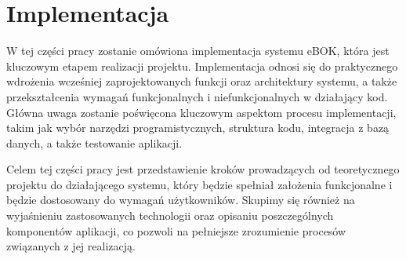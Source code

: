 \chapter{Implementacja}
W tej części pracy zostanie omówiona implementacja systemu eBOK, która jest kluczowym etapem realizacji projektu. Implementacja odnosi się do praktycznego wdrożenia wcześniej zaprojektowanych funkcji oraz architektury systemu, a także przekształcenia wymagań funkcjonalnych i niefunkcjonalnych w działający kod. Główna uwaga zostanie poświęcona kluczowym aspektom procesu implementacji, takim jak wybór narzędzi programistycznych, struktura kodu, integracja z bazą danych, a także testowanie aplikacji.

Celem tej części pracy jest przedstawienie kroków prowadzących od teoretycznego projektu do działającego systemu, który będzie spełniał założenia funkcjonalne i będzie dostosowany do wymagań użytkowników. Skupimy się również na wyjaśnieniu zastosowanych technologii oraz opisaniu poszczególnych komponentów aplikacji, co pozwoli na pełniejsze zrozumienie procesów związanych z jej realizacją.